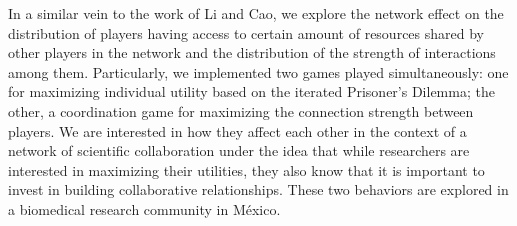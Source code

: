 \documentclass{bmcart}
\begin{document}




{\color{red}In a similar vein to the work of Li and Cao,} we explore the network
effect on the distribution of players having access to certain amount
of resources shared by other players in the network and the
distribution of the strength of interactions among them. Particularly,
we implemented two games played simultaneously: one for maximizing
individual utility based on the iterated Prisoner's Dilemma; the
other, a coordination game for maximizing the connection strength
between players. We are interested in how they affect each other in
the context of a network of scientific collaboration under the idea
that while researchers are interested in maximizing their utilities,
they also know that it is important to invest in building
collaborative relationships. These two behaviors are explored in a
biomedical research community in M\'exico.\\
\end{document}
